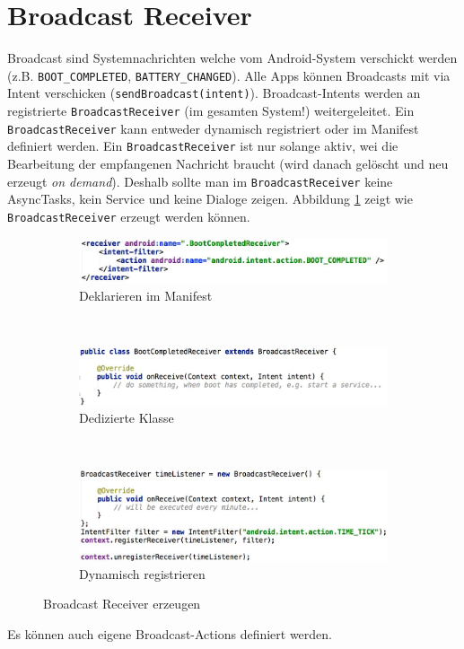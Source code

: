 \section{Broadcast Receiver}

Broadcast sind Systemnachrichten welche vom Android-System verschickt werden (z.B. \texttt{BOOT\_COMPLETED}, \texttt{BATTERY\_CHANGED}). Alle Apps können Broadcasts mit via Intent verschicken (\texttt{sendBroadcast(intent)}). Broadcast-Intents werden an registrierte \texttt{BroadcastReceiver} (im gesamten System!) weitergeleitet. Ein \texttt{BroadcastReceiver} kann entweder dynamisch registriert oder im Manifest definiert werden. Ein \texttt{BroadcastReceiver} ist nur solange aktiv, wei die Bearbeitung der empfangenen Nachricht braucht (wird danach gelöscht und neu erzeugt \emph{on demand}). Deshalb sollte man im \texttt{BroadcastReceiver} keine AsyncTasks, kein Service und keine Dialoge zeigen. Abbildung \ref{fig:broadcast-receiver} zeigt wie \texttt{BroadcastReceiver} erzeugt werden können.

\begin{figure}
	\centering
	\begin{subfigure}[b]{0.3\textwidth}
		\includegraphics[width=\textwidth]{fig/broadcast-receiver-manifest}
		\caption{Deklarieren im Manifest}
	\end{subfigure}
	~
	\begin{subfigure}[b]{0.3\textwidth}
		\includegraphics[width=\textwidth]{fig/broadcast-receiver-manifest-klasse}
		\caption{Dedizierte Klasse}
	\end{subfigure}
	~
	\begin{subfigure}[b]{0.3\textwidth}
		\includegraphics[width=\textwidth]{fig/broadcast-receiver-dynamisch}
		\caption{Dynamisch registrieren}
	\end{subfigure}
	\caption{Broadcast Receiver erzeugen}
	\label{fig:broadcast-receiver}
\end{figure}
Es können auch eigene Broadcast-Actions definiert werden.

